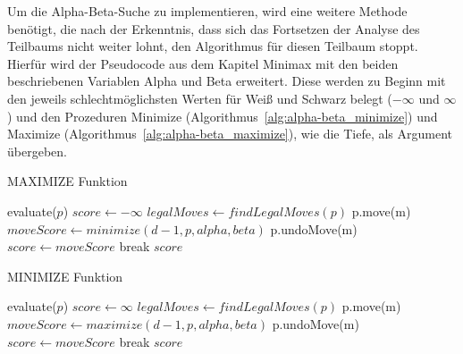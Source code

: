 Um die Alpha-Beta-Suche zu implementieren, wird eine weitere Methode benötigt, die nach der Erkenntnis, dass sich das Fortsetzen der Analyse des Teilbaums nicht weiter lohnt, den Algorithmus für diesen Teilbaum stoppt.
Hierfür wird der Pseudocode aus dem Kapitel Minimax mit den beiden beschriebenen Variablen Alpha und Beta erweitert.
Diese werden zu Beginn mit den jeweils schlechtmöglichsten Werten für Weiß und Schwarz belegt ($-\infty$ und $\infty$) und den Prozeduren Minimize (Algorithmus~\ref{alg:alpha-beta_minimize}) und Maximize (Algorithmus~\ref{alg:alpha-beta_maximize}), wie die Tiefe, als Argument übergeben.

\begin{algorithm}
    \caption{MAXIMIZE Funktion}
    \label{alg:alpha-beta_maximize}
    \begin{algorithmic}[1]
        \State \Return evaluate($p$)
        \Else
        \State $score \gets -\infty$
        \State $legalMoves \gets findLegalMoves(p)$
        \State p.move(m)
        \State $moveScore \gets minimize(d-1, p, alpha, beta)$
        \State p.undoMove(m)
        \State $score \gets moveScore$
        \EndIf
        \State break
        \EndIf
        \EndFor
        \EndIf
        \State \Return $score$
        \EndFunction
    \end{algorithmic}
\end{algorithm}

\begin{algorithm}
    \caption{MINIMIZE Funktion}
    \label{alg:alpha-beta_minimize}
    \begin{algorithmic}[1]
        \State \Return evaluate($p$)
        \Else
        \State $score \gets \infty$
        \State $legalMoves \gets findLegalMoves(p)$
        \State p.move(m)
        \State $moveScore \gets maximize(d-1, p, alpha, beta)$
        \State p.undoMove(m)
        \State $score \gets moveScore$
        \EndIf
        \State break
        \EndIf
        \EndFor
        \EndIf
        \State \Return $score$
        \EndFunction
    \end{algorithmic}
\end{algorithm}
\newpage
